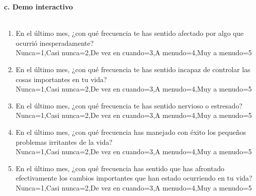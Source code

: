 \documentclass{article}
\begin{document}
\vspace{0.5cm}
\textbf{c. Demo interactivo}\\
\\

{\footnotesize
  \begin{Form}
    \begin{enumerate}
        \item En el último mes, ¿con qué frecuencia te has sentido afectado por algo que ocurrió inesperadamente?\\
              \ChoiceMenu[radio,name=respuesta01,radiosymbol=\ding{108}]{}
              {Nunca=1,Casi nunca=2,De vez en cuando=3,A menudo=4,Muy a menudo=5}\\

        \item En el último mes, ¿con qué frecuencia te has sentido incapaz de controlar las  cosas importantes en tu vida?\\
              \ChoiceMenu[radio, name=respuesta02, radiosymbol=\ding{108}]{}
              {Nunca=1,Casi nunca=2,De vez en cuando=3,A menudo=4,Muy a menudo=5}\\

        \item En el último mes, ¿con qué frecuencia te has sentido nervioso o estresado?\\
              \ChoiceMenu[radio, name=respuesta03, radiosymbol=\ding{108}]{}
              {Nunca=1,Casi nunca=2,De vez en cuando=3,A menudo=4,Muy a menudo=5}\\

        \item En el último mes, ¿con qué frecuencia has manejado con éxito los pequeños problemas irritantes de la vida?\\
              \ChoiceMenu[radio, name=respuesta04, radiosymbol=\ding{108}]{}
              {Nunca=1,Casi nunca=2,De vez en cuando=3,A menudo=4,Muy a menudo=5}\\

        \item En el último mes, ¿con qué frecuencia has sentido que has afrontado efectivamente los cambios importantes que han estado ocurriendo en tu vida?\\
              \ChoiceMenu[radio, name=respuesta05, radiosymbol=\ding{108}]{}
              {Nunca=1,Casi nunca=2,De vez en cuando=3,A menudo=4,Muy a menudo=5}\\


\end{enumerate}
\end{Form}}
\end{document}
